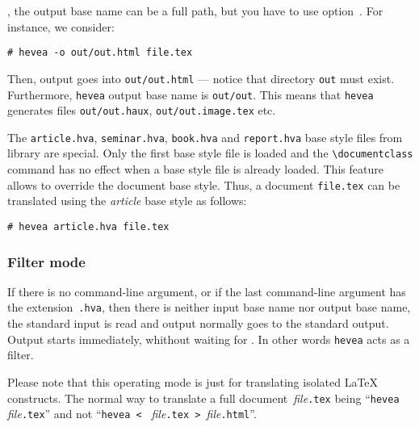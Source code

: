 , the output base name can be a full path,
but you have to use option~.
For instance, we consider:
\begin{verbatim}
# hevea -o out/out.html file.tex
\end{verbatim}
Then, \html{} output goes into \texttt{out/out.html} --- notice
that directory \texttt{out} must exist.
Furthermore, \texttt{hevea} output base name is \texttt{out/out}.
This means that \texttt{hevea} generates files
\texttt{out/out.haux}, \texttt{out/out.image.tex} etc.

The \texttt{article.hva}, \texttt{seminar.hva}, \texttt{book.hva} and
\texttt{report.hva}
base style files from \hevea{} library are special.
Only the first base style file is loaded and the
\verb+\documentclass+ command has no effect when a base style file is
already loaded. This feature allows to override the document base style.
Thus, a document \texttt{file.tex} can be translated using the
\textit{article} base style as follows:
\begin{verbatim}
# hevea article.hva file.tex
\end{verbatim}

\subsubsection{Filter mode}
If there is no command-line argument, or if the last command-line
argument has the extension~\texttt{.hva}, then
there is neither input base name nor output base name,
the standard input is read and
output normally goes to the standard output.
Output starts immediately, whithout waiting for \verb++.
In other words \texttt{hevea} acts as a filter.

Please note that this operating mode is just for translating
isolated \LaTeX{} constructs.
The normal way to translate a full document~\textit{file}\verb+.tex+ being
``\verb+hevea+ \textit{file}\verb+.tex+'' and not
``\verb+hevea < + \textit{file}\verb+.tex > +\textit{file}\verb+.html+''.


